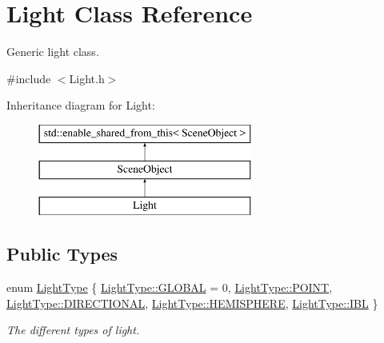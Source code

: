 \hypertarget{class_light}{}\section{Light Class Reference}
\label{class_light}


Generic light class.  




{\ttfamily \#include $<$Light.\+h$>$}

Inheritance diagram for Light\+:\begin{figure}[H]
\begin{center}
\leavevmode
\includegraphics[height=3.000000cm]{class_light}
\end{center}
\end{figure}
\subsection*{Public Types}
\begin{DoxyCompactItemize}
\item 
enum \hyperlink{class_light_a661d9480e01af8b1612860b9630ef5f8}{Light\+Type} \{ \newline
\hyperlink{class_light_a661d9480e01af8b1612860b9630ef5f8a6eecfba72d12922ee1dead07a0ef3334}{Light\+Type\+::\+G\+L\+O\+B\+AL} = 0, 
\hyperlink{class_light_a661d9480e01af8b1612860b9630ef5f8aaebdbcb765394d25d6a604589a890f82}{Light\+Type\+::\+P\+O\+I\+NT}, 
\hyperlink{class_light_a661d9480e01af8b1612860b9630ef5f8ab6f2249394a4def60a78b342dcc925b9}{Light\+Type\+::\+D\+I\+R\+E\+C\+T\+I\+O\+N\+AL}, 
\hyperlink{class_light_a661d9480e01af8b1612860b9630ef5f8a745727a64f32080cf213b668026dde48}{Light\+Type\+::\+H\+E\+M\+I\+S\+P\+H\+E\+RE}, 
\newline
\hyperlink{class_light_a661d9480e01af8b1612860b9630ef5f8a239e71da0606abd283f2bccf1965badd}{Light\+Type\+::\+I\+BL}
 \}\begin{DoxyCompactList}\small\item\em The different types of light. \end{DoxyCompactList}
\end{DoxyCompactItemize}
